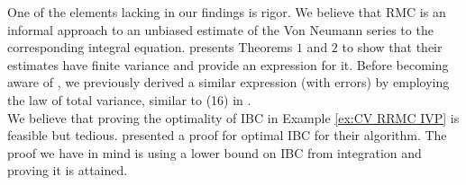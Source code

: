 \documentclass[a4paper,12pt]{article}
\begin{document}

One of the elements lacking in our findings is rigor.  We believe
that RMC is an informal approach to an unbiased estimate of
the Von Neumann series to the corresponding integral equation.
\cite{ermakov_monte_2021} presents Theorems $1$ and $2$ to
show that their estimates have finite variance and provide an expression for it.
Before becoming aware of \cite{ermakov_monte_2021}, we
previously derived a similar expression (with errors)
by employing the law of total variance, similar to (16) in \cite{rath_ears_2022}. \\
We believe that proving the optimality of IBC in Example \ref{ex:CV RRMC IVP} is feasible
but tedious.
\cite{daun_randomized_2011} presented a proof for optimal IBC for their algorithm.
The proof we have in mind is using a lower bound on IBC
from integration and proving it is attained.\\




\newpage
\begin{abstract}
  
\end{abstract}

\printbibliography
\newpage
\end{document}
